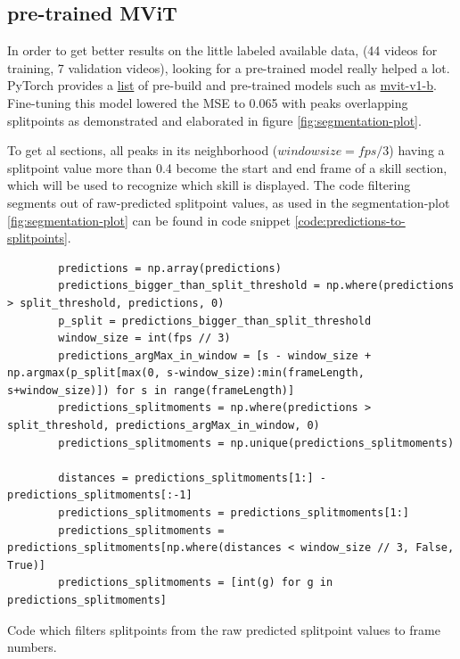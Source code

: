 \subsection{pre-trained MViT}

In order to get better results on the little labeled available data, (44 videos for training, 7 validation videos), looking for a pre-trained model really helped a lot.
PyTorch provides a \href{https://pytorch.org/vision/main/models.html}{list} of pre-build and pre-trained models such as \href{https://pytorch.org/vision/main/models/video_mvit.html}{mvit-v1-b}.
Fine-tuning this model lowered the MSE to 0.065 with peaks overlapping splitpoints as demonstrated and elaborated in figure \ref{fig:segmentation-plot}.

To get al sections, all peaks in its neighborhood (\(windowsize = fps / 3\)) having a splitpoint value more than 0.4 become the start and end frame of a skill section, which will be used to recognize which skill is displayed. The code filtering segments out of raw-predicted splitpoint values, as used in the segmentation-plot \ref{fig:segmentation-plot} can be found in code snippet \ref{code:predictions-to-splitpoints}.

\begin{listing}
    \begin{verbatim}
        predictions = np.array(predictions)
        predictions_bigger_than_split_threshold = np.where(predictions > split_threshold, predictions, 0)
        p_split = predictions_bigger_than_split_threshold
        window_size = int(fps // 3)
        predictions_argMax_in_window = [s - window_size + np.argmax(p_split[max(0, s-window_size):min(frameLength, s+window_size)]) for s in range(frameLength)]
        predictions_splitmoments = np.where(predictions > split_threshold, predictions_argMax_in_window, 0)
        predictions_splitmoments = np.unique(predictions_splitmoments)

        distances = predictions_splitmoments[1:] - predictions_splitmoments[:-1]
        predictions_splitmoments = predictions_splitmoments[1:]
        predictions_splitmoments = predictions_splitmoments[np.where(distances < window_size // 3, False, True)]
        predictions_splitmoments = [int(g) for g in predictions_splitmoments]
    \end{verbatim}
    \caption[predictions-to-splitpoints]{Code which filters splitpoints from the raw predicted splitpoint values to frame numbers.}
    \label{code:predictions-to-splitpoints}
\end{listing}

